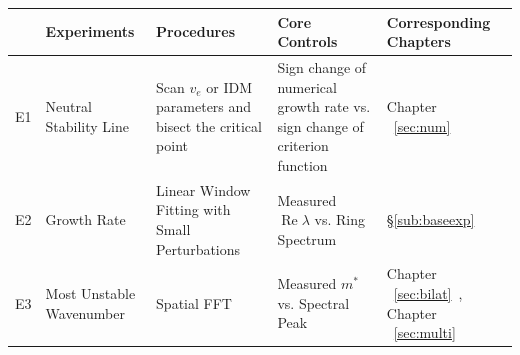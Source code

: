 \documentclass[11pt,a4paper,openany]{book}
\numberwithin{equation}{chapter}
\numberwithin{figure}{chapter}
\numberwithin{table}{chapter}
\begin{document}
\begin{center}
\scriptsize
{}
\label{tab:experiment-index}
\begin{tabular}{p{0.85cm}p{2.3cm}p{3.5cm}p{4.2cm}p{2.7cm}}
\toprule
& \textbf{Experiments} & \textbf{Procedures} & \textbf{Core Controls} & \textbf{Corresponding Chapters} \\
\midrule
E1 &




 Neutral Stability Line




&




 Scan $v_e$ or IDM parameters and bisect the critical point




&




 Sign change of numerical growth rate vs. sign change of criterion function




&




Chapter ~\ref{sec:num}~



\\
E2 &




Growth Rate




&




Linear Window Fitting with Small Perturbations




&




 Measured $\operatorname{Re}\lambda$ vs. Ring Spectrum




& \S\ref{sub:baseexp} \\
E3 &




Most Unstable Wavenumber




&




Spatial FFT& Measured $m^*$ vs. Spectral Peak




&




 Chapter ~\ref{sec:bilat}~, Chapter ~\ref{sec:multi}~




\end{tabular}
\end{center}
\end{document}

